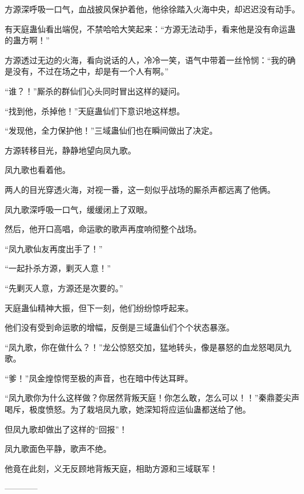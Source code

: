 \begin{this_body}
方源深呼吸一口气，血战披风保护着他，他徐徐踏入火海中央，却迟迟没有动手。

有天庭蛊仙看出端倪，不禁哈哈大笑起来：“方源无法动手，看来他是没有命运蛊的蛊方啊！”

方源透过无边的火海，看向说话的人，冷冷一笑，语气中带着一丝怜悯：“我的确是没有，不过在场之中，却是有一个人有啊。”

“谁？！”厮杀的群仙们心头同时冒出这样的疑问。

“找到他，杀掉他！”天庭蛊仙们下意识地这样想。

“发现他，全力保护他！”三域蛊仙们也在瞬间做出了决定。

方源转移目光，静静地望向凤九歌。

凤九歌也看着他。

两人的目光穿透火海，对视一番，这一刻似乎战场的厮杀声都远离了他俩。

凤九歌深呼吸一口气，缓缓闭上了双眼。

然后，他开口高唱，命运歌的歌声再度响彻整个战场。

“凤九歌仙友再度出手了！”

“一起扑杀方源，剿灭人意！”

“先剿灭人意，方源还是次要的。”

天庭蛊仙精神大振，但下一刻，他们纷纷惊呼起来。

他们没有受到命运歌的增幅，反倒是三域蛊仙们个个状态暴涨。

“凤九歌，你在做什么？！”龙公惊怒交加，猛地转头，像是暴怒的血龙怒喝凤九歌。

“爹！”凤金煌惊愕至极的声音，也在暗中传达耳畔。

“凤九歌你为什么这样做？你居然背叛天庭！你怎么敢，怎么可以！！”秦鼎菱尖声喝斥，极度愤怒。为了栽培凤九歌，她深知将应运仙蛊都送给了他。

但凤九歌却做出了这样的“回报”！

凤九歌面色平静，歌声不绝。

他竟在此刻，义无反顾地背叛天庭，相助方源和三域联军！

------------

\end{this_body}

